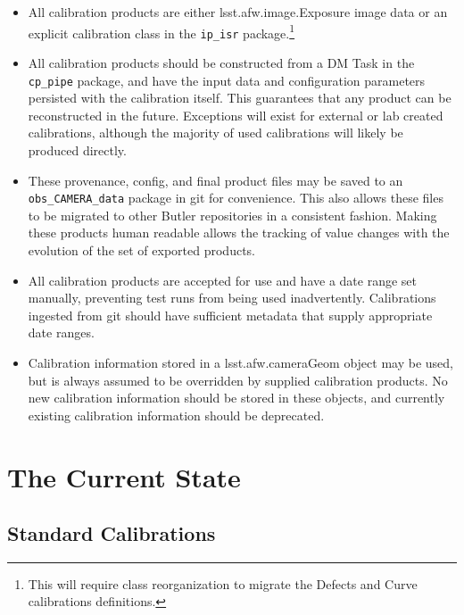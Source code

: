 \documentclass[DM,authoryear,toc]{lsstdoc}
\begin{document}
\begin{itemize}
\item All calibration products are either lsst.afw.image.Exposure
  image data or an explicit calibration class in the \verb|ip_isr|
  package.\footnote{This will require class reorganization to migrate
    the Defects and Curve calibrations definitions.}
\item All calibration products should be constructed from a DM Task in
  the \verb|cp_pipe| package, and have the input data and
  configuration parameters persisted with the calibration itself.
  This guarantees that any product can be reconstructed in the future.
  Exceptions will exist for external or lab created calibrations,
  although the majority of used calibrations will likely be produced
  directly.
\item These provenance, config, and final product files may be saved
  to an \verb|obs_CAMERA_data| package in git for convenience.  This
  also allows these files to be migrated to other Butler repositories
  in a consistent fashion.  Making these products human readable
  allows the tracking of value changes with the evolution of the set
  of exported products.
\item All calibration products are accepted for use and have a date
  range set manually, preventing test runs from being used
  inadvertently.  Calibrations ingested from git should have sufficient
  metadata that supply appropriate date ranges.
\item Calibration information stored in a lsst.afw.cameraGeom object
  may be used, but is always assumed to be overridden by supplied
  calibration products.  No new calibration information should be
  stored in these objects, and currently existing calibration
  information should be deprecated.

\end{itemize}

\section{The Current State}

\subsection{Standard Calibrations}
\end{document}
